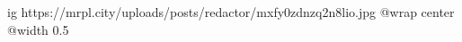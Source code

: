 
 
 
 
 

\ifcmt
  ig https://mrpl.city/uploads/posts/redactor/mxfy0zdnzq2n8lio.jpg
  @wrap center
  @width 0.5
\fi
